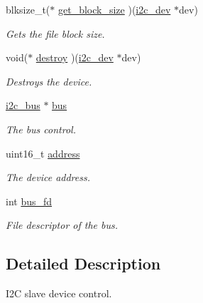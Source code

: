 \begin{DoxyCompactItemize}
\mbox{\label{structi2c__dev_a7c3efa72c8dc90af3ca44f8f3900871c}} 
blksize\+\_\+t($\ast$ \mbox{\hyperlink{structi2c__dev_a7c3efa72c8dc90af3ca44f8f3900871c}{get\+\_\+block\+\_\+size}} )(\mbox{\hyperlink{structi2c__dev}{i2c\+\_\+dev}} $\ast$dev)
\begin{DoxyCompactList}\small\item\em Gets the file block size. \end{DoxyCompactList}\item 
\mbox{\label{structi2c__dev_a895f44d533e83181a81c733baa918853}} 
void($\ast$ \mbox{\hyperlink{structi2c__dev_a895f44d533e83181a81c733baa918853}{destroy}} )(\mbox{\hyperlink{structi2c__dev}{i2c\+\_\+dev}} $\ast$dev)
\begin{DoxyCompactList}\small\item\em Destroys the device. \end{DoxyCompactList}\item 
\mbox{\label{structi2c__dev_a790d6a94267e4d9c2e7ecc5f786026d5}} 
\mbox{\hyperlink{structi2c__bus}{i2c\+\_\+bus}} $\ast$ \mbox{\hyperlink{structi2c__dev_a790d6a94267e4d9c2e7ecc5f786026d5}{bus}}
\begin{DoxyCompactList}\small\item\em The bus control. \end{DoxyCompactList}\item 
\mbox{\label{structi2c__dev_a98d10848b192f95e5d5dacbe41fbdf18}} 
uint16\+\_\+t \mbox{\hyperlink{structi2c__dev_a98d10848b192f95e5d5dacbe41fbdf18}{address}}
\begin{DoxyCompactList}\small\item\em The device address. \end{DoxyCompactList}\item 
int \mbox{\hyperlink{structi2c__dev_acd71af6b9e6535e147bb3eacb158ef8c}{bus\+\_\+fd}}
\begin{DoxyCompactList}\small\item\em File descriptor of the bus. \end{DoxyCompactList}\end{DoxyCompactItemize}


\subsection{Detailed Description}
I2C slave device control. 

